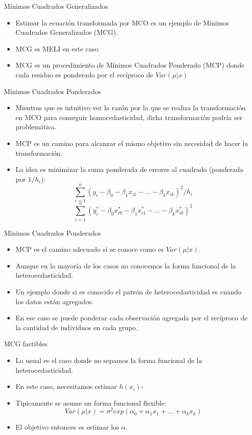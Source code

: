 \begin{frame}{Mínimos Cuadrados Generalizados}
	\begin{itemize}
		\item Estimar la ecuación transformada por MCO es un ejemplo de Mínimos Cuadrados Generalizados (MCG).	
		\item MCG es MELI en este caso.
		\item MCG es un procedimiento de Mínimos Cuadrados Ponderado (MCP) donde cada residuo es ponderado por el recíproco de $Var(\mu|x)$
	\end{itemize}
\end{frame}
\begin{frame}{Mínimos Cuadrados Ponderados}
	\begin{itemize}
		\item Mientras que es intuitivo ver la razón por la que se realiza la transformación en MCO para conseguir homocedasticidad, dicha transformación podría ser problemática.	
		\item MCP es un camino para alcanzar el mismo objetivo sin necesidad de hacer la transformación.
		\item La idea es minimizar la suma ponderada de errores al cuadrado (ponderada por $1/h_i$):
				$$\sum_{i=1}^n(y_i-\beta_0-\beta_1 x_{i1}-...-\beta_k x_{ik})^2/h_i$$
				$$\sum_{i=1}^n(y_i^*-\beta_0 x_{i0}^*-\beta_1 x_{i1}^*-...-\beta_k x_{ik}^*)^2$$
	\end{itemize}
\end{frame}
\begin{frame}{Mínimos Cuadrados Ponderados}
	\begin{itemize}
		\item MCP es el camino adecuado si se conoce como es $Var(\mu|x)$.	
		\item Aunque en la mayoría de los casos no conocemos la forma funcional de la heterocedasticidad.
		\item Un ejemplo donde si es conocido el patrón de heterocedasticidad es cuando los datos están agregados.
		\item En ese caso se puede ponderar cada observación agregada por el recíproco de la cantidad de individuos en cada grupo.
	\end{itemize}
\end{frame}
\begin{frame}{MCG factibles}
	\begin{itemize}
		\item Lo usual es el caso donde no sepamos la forma funcional de la heterocedasticidad.
		\item En este caso, necesitamos estimar $h(x_i)$-
		\item Tipicamente se asume un forma funcional flexible:
				$$Var(\mu | x)=\sigma^2 exp(\alpha_0+\alpha_1 x_1+...+\alpha_k x_k)$$
		\item El objetivo entonces es estimar los $\alpha$.
	\end{itemize}
\end{frame}
